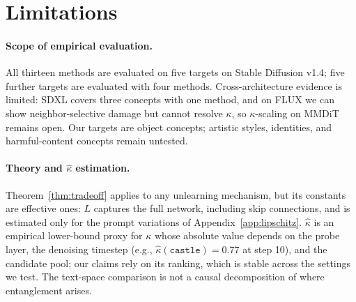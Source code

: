 \section{Limitations}
\label{sec:limitations}

\paragraph{Scope of empirical evaluation.} All thirteen methods are evaluated on five targets on Stable Diffusion v1.4; five further targets are evaluated with four methods. Cross-architecture evidence is limited: SDXL covers three concepts with one method, and on FLUX we can show neighbor-selective damage but cannot resolve $\kappa$, so $\kappa$-scaling on MMDiT remains open. Our targets are object concepts; artistic styles, identities, and harmful-content concepts remain untested.

\paragraph{Theory and $\hat\kappa$ estimation.} Theorem~\ref{thm:tradeoff} applies to any unlearning mechanism, but its constants are effective ones: $L$ captures the full network, including skip connections, and is estimated only for the prompt variations of Appendix~\ref{app:lipschitz}. $\hat\kappa$ is an empirical lower-bound proxy for $\kappa$ whose absolute value depends on the probe layer, the denoising timestep (e.g., $\hat\kappa(\texttt{castle})=0.77$ at step 10), and the candidate pool; our claims rely on its ranking, which is stable across the settings we test. The text-space comparison is not a causal decomposition of where entanglement arises.

